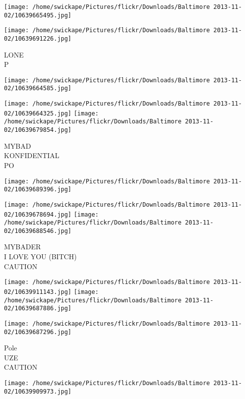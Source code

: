 \documentclass[10pt,letterpaper]{article}
\begin{document}
\texttt{[image: /home/swickape/Pictures/flickr/Downloads/Baltimore 2013-11-02/10639665495.jpg]}

\vspace{0.25in}
\texttt{[image: /home/swickape/Pictures/flickr/Downloads/Baltimore 2013-11-02/10639691226.jpg]}

LONE\\
P\\
\pagebreak

\texttt{[image: /home/swickape/Pictures/flickr/Downloads/Baltimore 2013-11-02/10639664585.jpg]}

\vspace{0.25in}
\texttt{[image: /home/swickape/Pictures/flickr/Downloads/Baltimore 2013-11-02/10639664325.jpg]}
\texttt{[image: /home/swickape/Pictures/flickr/Downloads/Baltimore 2013-11-02/10639679854.jpg]}

MYBAD\\
KONFIDENTIAL\\
PO\\
\pagebreak

\texttt{[image: /home/swickape/Pictures/flickr/Downloads/Baltimore 2013-11-02/10639689396.jpg]}

\vspace{0.25in}
\texttt{[image: /home/swickape/Pictures/flickr/Downloads/Baltimore 2013-11-02/10639678694.jpg]}
\texttt{[image: /home/swickape/Pictures/flickr/Downloads/Baltimore 2013-11-02/10639688546.jpg]}

MYBADER\\
I LOVE YOU (BITCH)\\
CAUTION\\
\pagebreak

\texttt{[image: /home/swickape/Pictures/flickr/Downloads/Baltimore 2013-11-02/10639911143.jpg]}
\texttt{[image: /home/swickape/Pictures/flickr/Downloads/Baltimore 2013-11-02/10639687886.jpg]}

\vspace{0.25in}
\texttt{[image: /home/swickape/Pictures/flickr/Downloads/Baltimore 2013-11-02/10639687296.jpg]}

Pole\\
UZE\\
CAUTION\\
\pagebreak

\texttt{[image: /home/swickape/Pictures/flickr/Downloads/Baltimore 2013-11-02/10639909973.jpg]}
\end{document}
